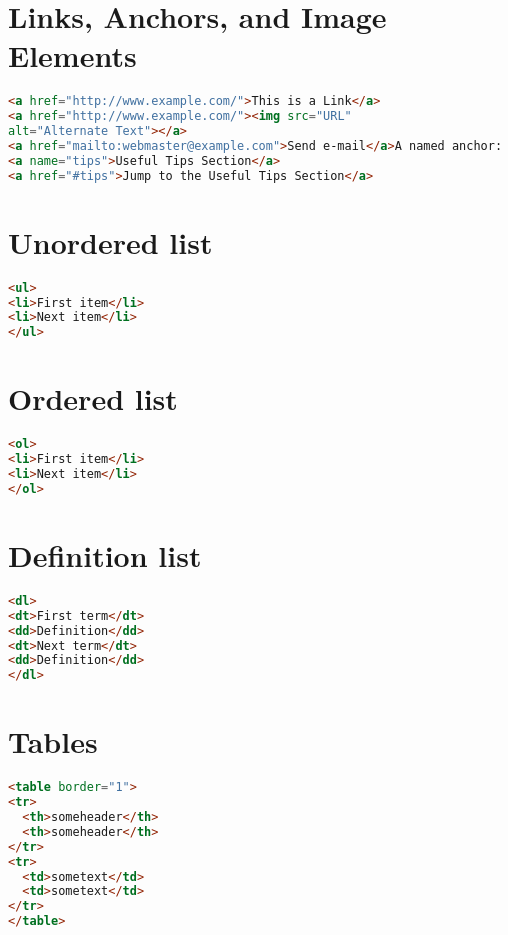 \section{Links, Anchors, and Image Elements}


\begin{lstlisting}[language=HTML]
<a href="http://www.example.com/">This is a Link</a>
<a href="http://www.example.com/"><img src="URL"
alt="Alternate Text"></a>
<a href="mailto:webmaster@example.com">Send e-mail</a>A named anchor:
<a name="tips">Useful Tips Section</a>
<a href="#tips">Jump to the Useful Tips Section</a>
\end{lstlisting}


\section{Unordered list}

\begin{lstlisting}[language=HTML]
<ul>
<li>First item</li>
<li>Next item</li>
</ul>
\end{lstlisting}

\section{Ordered list}


\begin{lstlisting}[language=HTML]
<ol>
<li>First item</li>
<li>Next item</li>
</ol>
\end{lstlisting}

\section{Definition list}

\begin{lstlisting}[language=HTML]
<dl>
<dt>First term</dt>
<dd>Definition</dd>
<dt>Next term</dt>
<dd>Definition</dd>
</dl>
\end{lstlisting}

\section{Tables}

\begin{lstlisting}[language=HTML]
<table border="1">
<tr>
  <th>someheader</th>
  <th>someheader</th>
</tr>
<tr>
  <td>sometext</td>
  <td>sometext</td>
</tr>
</table>
\end{lstlisting}


